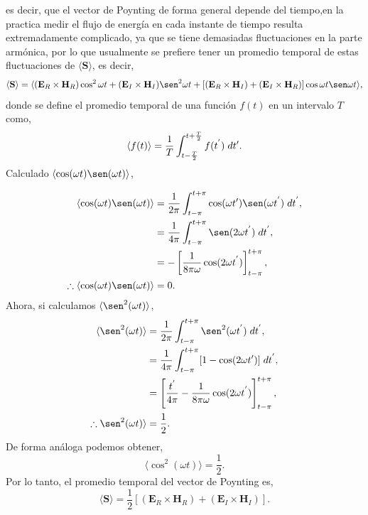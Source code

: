 \documentclass[11pt,fleqn]{book} %
\begin{document}
es decir, que el vector de Poynting de forma general depende del tiempo,en la practica medir el flujo de energ\'ia en cada instante de tiempo resulta extremadamente complicado, ya que se tiene demasiadas fluctuaciones en la parte arm\'onica, por lo que usualmente se prefiere tener un promedio temporal de estas fluctuaciones de  $\langle\textbf{S}\rangle$, es decir,
\begin{equation*}
\langle\textbf{S}\rangle=\langle(\textbf{E}_R\times\textbf{H}_R)\cos^{2}\omega t+(\textbf{E}_I\times \textbf{H}_I)\sen^{2} \omega t+[(\textbf{E}_R\times \textbf{H}_I)+(\textbf{E}_I\times \textbf{H}_R)]\cos \omega t \sen\omega t\rangle,
\end{equation*}
donde se define el promedio temporal de una funci\'on $f(t)$ en un intervalo $T$ como,
\begin{equation*}
\langle f(t)\rangle=\frac{1}{T}\int_{t-\frac{T}{2}}^{t+\frac{T}{2}} f(t^{'})\hspace{1mm} dt{'}.
\end{equation*}
Calculado $\langle \cos(\omega t) \sen(\omega t)  \rangle $,

\begin{equation*}
\begin{split}
\langle \cos(\omega t) \sen(\omega t)  \rangle&=\frac{1}{2\pi} \int_{t-\pi}^{t+\pi} \cos(\omega t') \sen(\omega t^{'}) \hspace{1mm} dt^{'},\\
&=\frac{1}{4\pi} \int_{t-\pi}^{t+\pi} \sen(2\omega t^{'}) \hspace{1mm} dt^{'},\\
&=-\left[\frac{1}{8\pi\omega} \cos(2\omega t^{'})\right]_{t-\pi}^{t+\pi},\\
\therefore  \langle \cos(\omega t) \sen(\omega t)  \rangle&=0.
\end{split}
\end{equation*}
Ahora, si calculamos $\langle \sen^{2}(\omega t)\rangle$,
\begin{equation*}
\begin{split}
\langle \sen^2(\omega t)  \rangle&=\frac{1}{2\pi} \int_{t-\pi}^{t+\pi} \sen^2(\omega t^{'}) \hspace{1mm} dt^{'},\\
&=\frac{1}{4\pi} \int_{t-\pi}^{t+\pi} [1-\cos(2\omega t{'})] \hspace{1mm} dt^{'},\\
&=\left[\frac{t^{'}}{4\pi} - \frac{1}{8\pi\omega} \cos(2\omega t^{'})\right]_{t-\pi}^{t+\pi},\\
\therefore  \sen^2(\omega t)  \rangle&=\frac{1}{2}.
\end{split}
\end{equation*}
De forma an\'aloga podemos obtener,
\begin{equation*}
\langle \cos^{2}(\omega t)\rangle=\frac{1}{2}.
\end{equation*}
Por lo tanto, el promedio temporal del vector de Poynting es,
\begin{equation} \label{PromS}
 \langle \textbf{S}\rangle=\frac12[(\textbf{E}_R\times\textbf{H}_R)+(\textbf{E}_I\times \textbf{H}_I)].
\end{equation}
\end{document}
